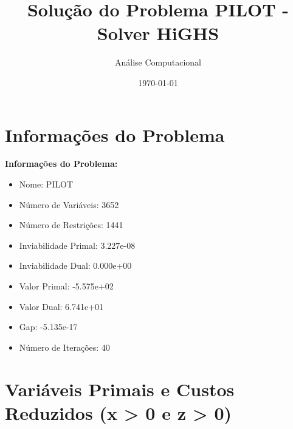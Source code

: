 \documentclass[12pt]{article}
\title{Solução do Problema PILOT - Solver HiGHS}
\author{Análise Computacional}
\date{\today}
\begin{document}
\maketitle

\section{Informações do Problema}

\textbf{Informações do Problema:}
\begin{itemize}
\item Nome: PILOT
\item Número de Variáveis: 3652
\item Número de Restrições: 1441
\item Inviabilidade Primal: 3.227e-08
\item Inviabilidade Dual: 0.000e+00
\item Valor Primal: -5.575e+02
\item Valor Dual: 6.741e+01
\item Gap: -5.135e-17
\item Número de Iterações: 40
\end{itemize}


\section{Variáveis Primais e Custos Reduzidos (x > 0 e z > 0)}
\end{document}
